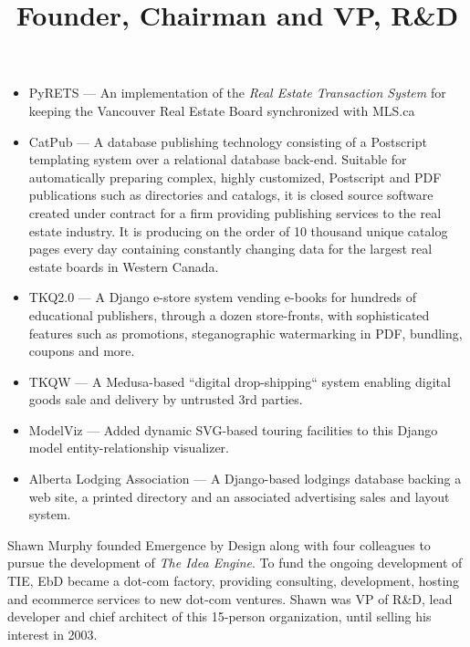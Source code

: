 \documentclass[line,margin,hidelinks]{res}
\begin{document}
\begin{resume}
\begin{position}
\begin{itemize}
  \item PyRETS --- An implementation of the \emph{Real Estate Transaction System}
  for keeping the Vancouver Real Estate Board synchronized with MLS.ca

  \item CatPub --- A database publishing technology consisting of a
  Postscript templating system over a relational database back-end.
  Suitable for automatically preparing complex, highly customized,
  Postscript and PDF publications such as directories and catalogs,
  it is closed source software created under contract for a firm
  providing publishing services to the real estate industry.
  It is producing on the order of 10 thousand unique catalog pages
  every day containing constantly changing data for the largest
  real estate boards in Western Canada.

  \item TKQ2.0 --- A Django e-store system vending e-books for hundreds
  of educational publishers, through a dozen store-fronts, with sophisticated
  features such as promotions, steganographic watermarking in PDF, bundling,
  coupons and more.

  \item TKQW --- A Medusa-based ``digital drop-shipping`` system
  enabling digital goods sale and delivery by untrusted 3rd parties.

  \item ModelViz --- Added dynamic SVG-based touring facilities to this Django
  model entity-relationship visualizer.

  \item Alberta Lodging Association --- A Django-based lodgings database
  backing a web site, a printed directory and an associated advertising
  sales and layout system.

\end{itemize}

\end{position}




\title{ Founder, Chairman and VP, R\&D }

\begin{position}
  Shawn Murphy founded Emergence by Design along with four colleagues to pursue
  the development of \emph{The Idea Engine}.  To fund the ongoing development of
  TIE, EbD became a dot-com factory, providing consulting,
  development, hosting and ecommerce services to new dot-com ventures.
  Shawn was VP of R\&D, lead developer and chief architect of this 15-person
  organization, until selling his interest in 2003.


\end{position}
\end{resume}
\end{document}
